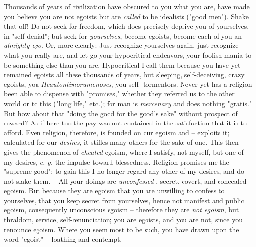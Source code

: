 \documentclass[a4paper]{book}
\begin{document}
Thousands of years of civilization have obscured to you what you are, have 
made you believe you are not egoists but are \textit{called} to be idealists 
("{}good men"{}). Shake that off! Do not seek for freedom, which does 
precisely deprive you of yourselves, in "{}self-denial"{}; but seek for 
\textit{yourselves}, become egoists, become each of you an \textit{almighty 
ego}. Or, more clearly: Just recognize yourselves again, just recognize what 
you really are, and let go your hypocritical endeavors, your foolish mania to 
be something else than you are. Hypocritical I call them because you have yet 
remained egoists all these thousands of years, but sleeping, self-deceiving, 
crazy egoists, you \textit{Heautontimorumenoses}, you self- tormentors. Never 
yet has a religion been able to dispense with "{}promises,"{} whether they 
referred us to the other world or to this ("{}long life,"{} etc.); for man is 
\textit{mercenary} and does nothing "{}gratis."{} But how about that "{}doing 
the good for the good's sake"{} without prospect of reward? As if here too the 
pay was not contained in the satisfaction that it is to afford. Even religion, 
therefore, is founded on our egoism and -- exploits it; calculated for our 
\textit{desires}, it stifles many others for the sake of one. This then gives 
the phenomenon of \textit{cheated} egoism, where I satisfy, not myself, but 
one of my desires, \textit{e. g.} the impulse toward blessedness. Religion 
promises me the -- "{}supreme good"{}; to gain this I no longer regard any 
other of my desires, and do not slake them. -- All your doings are 
\textit{unconfessed} , secret, covert, and concealed egoism. But because they 
are egoism that you are unwilling to confess to yourselves, that you keep 
secret from yourselves, hence not manifest and public egoism, consequently 
unconscious egoism -- therefore they are \textit{not egoism}, but thraldom, 
service, self-renunciation; you are egoists, and you are not, since you 
renounce egoism. Where you seem most to be such, you have drawn upon the word 
"{}egoist"{} -- loathing and contempt.
\end{document}
